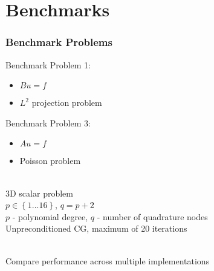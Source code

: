 \documentclass{beamer}
\begin{document}
\section{Benchmarks}

\begin{frame}
\begin{center}
\frametitle{Benchmark Problems}

\begin{multicols}{2}

\begin{flushleft}
Benchmark Problem 1:
\end{flushleft}

\begin{itemize}

\item $B u = f$

\item $L^2$ projection problem

\end{itemize}

\begin{flushleft}
Benchmark Problem 3:
\end{flushleft}

\begin{itemize}

\item $A u = f$

\item Poisson problem

\end{itemize}

\end{multicols}

\begin{flushleft}

~\\

3D scalar problem\\

$p \in \left\{ 1 ... 16 \right\}$, $q = p + 2$\\

$p$ - polynomial degree, $q$ - number of quadrature nodes\\

Unpreconditioned CG, maximum of 20 iterations

~\\

Compare performance across multiple implementations

\end{flushleft}

\end{center}
\end{frame}
\end{document}
